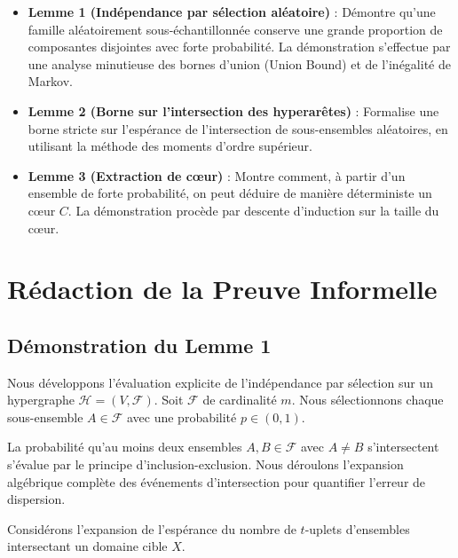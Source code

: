 \documentclass[12pt,a4paper]{article}
\begin{document}
\begin{itemize}
    \item \textbf{Lemme 1 (Indépendance par sélection aléatoire)} : Démontre qu'une famille aléatoirement sous-échantillonnée conserve une grande proportion de composantes disjointes avec forte probabilité. La démonstration s'effectue par une analyse minutieuse des bornes d'union (Union Bound) et de l'inégalité de Markov.
    \item \textbf{Lemme 2 (Borne sur l'intersection des hyperarêtes)} : Formalise une borne stricte sur l'espérance de l'intersection de sous-ensembles aléatoires, en utilisant la méthode des moments d'ordre supérieur.
    \item \textbf{Lemme 3 (Extraction de cœur)} : Montre comment, à partir d'un ensemble de forte probabilité, on peut déduire de manière déterministe un cœur $C$. La démonstration procède par descente d'induction sur la taille du cœur.
\end{itemize}

\section{Rédaction de la Preuve Informelle}

\subsection{Démonstration du Lemme 1}

Nous développons l'évaluation explicite de l'indépendance par sélection sur un hypergraphe $\mathcal{H} = (V, \mathcal{F})$. Soit $\mathcal{F}$ de cardinalité $m$. Nous sélectionnons chaque sous-ensemble $A \in \mathcal{F}$ avec une probabilité $p \in (0, 1)$.

La probabilité qu'au moins deux ensembles $A, B \in \mathcal{F}$ avec $A \neq B$ s'intersectent s'évalue par le principe d'inclusion-exclusion. Nous déroulons l'expansion algébrique complète des événements d'intersection pour quantifier l'erreur de dispersion.

Considérons l'expansion de l'espérance du nombre de $t$-uplets d'ensembles intersectant un domaine cible $X$.
\end{document}

